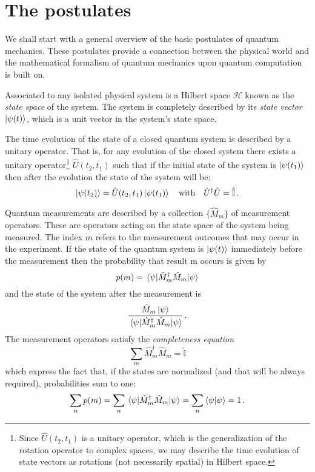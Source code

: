 \section{The postulates}
We shall start with a general overview of the basic postulates of quantum mechanics. These postulates provide a connection between the physical world and the mathematical formalism of quantum mechanics upon quantum computation is built on.
\begin{postulate}\label{postulate:1}
Associated to any isolated physical system is a Hilbert space $\mathcal{H}$ known as the \emph{state space} of the
system. The system is completely described by its \emph{state vector} $\ket{\psi(t)}$, which is a unit
vector in the system’s state space.
\end{postulate}
\begin{postulate}\label{postulate:2}
The time evolution of the state of a closed quantum system is described by a
unitary operator. That is, for any evolution of the closed system there exists
a unitary operator\footnote{Since $\widehat{U}(t_2,t_1)$ is a unitary operator, which is the generalization of the rotation operator to complex spaces, we may describe the time evolution of state vectors as rotations (not necessarily spatial) in Hilbert space.} $\widehat{U}(t_2,t_1)$ such that if the initial state of the system is $\ket{\psi(t_1)}$ then
after the evolution the state of the system will be:
\begin{equation*}
    \ket{\psi(t_2)} = \hat{U}(t_2,t_1) \ket{\psi(t_1)} \quad \text{with} \quad \hat{U}^\dagger\hat{U} = \hat{\mathbb{I}}\,.
\end{equation*}
\end{postulate}
\begin{postulate}\label{postulate:3}
Quantum measurements are described by a collection $\{\hat{M}_m\}$ of
measurement operators. These are operators acting on the state space of the
system being measured. The index $m$ refers to the measurement outcomes that
may occur in the experiment. If the state of the quantum system is $\ket{\psi(t)}$
immediately before the measurement then the probability that result m occurs is given by
\begin{equation*}
    p(m) = \expval{\hat{M}^\dagger_m \hat{M}_m}{\psi}
\end{equation*}
and the state of the system after the measurement is
\begin{equation*}
    \frac{\hat{M}_m\ket{\psi}}{\expval{\hat{M}^\dagger_m \hat{M}_m}{\psi}}\,.
\end{equation*}
The measurement operators satisfy the \emph{completeness equation}
\begin{equation*}
    \sum_m \hat{M}_m^\dagger \hat{M}_m = \hat{\mathbb{I}}
\end{equation*}
which express the fact that, if the states are normalized (and that will be always required), probabilities sum to one: 
    \begin{equation}\label{eq:normalization}
    \sum_n p(m) = \sum_n \expval{\hat{M}^\dagger_m \hat{M}_m}{\psi} = \sum_n \braket{\psi} = 1\,.
    \end{equation}
\end{postulate}
